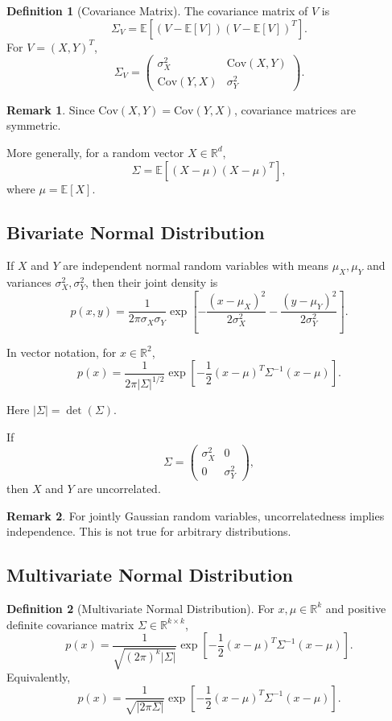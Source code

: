 \documentclass[12pt,oneside]{book}
\numberwithin{equation}{section}
\theoremstyle{definition}
\newtheorem{definition}{Definition}[section]
\newtheorem{remark}{Remark}[section]
\theoremstyle{plain}
\theoremstyle{remark}
\newcommand{\R}{\mathbb{R}}
\newcommand{\E}{\mathbb{E}}
\newcommand{\Cov}{\mathrm{Cov}}
\begin{document}
\begin{definition}[Covariance Matrix]
The covariance matrix of $V$ is
\[
\Sigma_V
=
\E\left[(V-\E[V])(V-\E[V])^T\right].
\]
For $V=(X,Y)^T$,
\[
\Sigma_V
=
\begin{pmatrix}
\sigma_X^2 & \Cov(X,Y)\\
\Cov(Y,X) & \sigma_Y^2
\end{pmatrix}.
\]
\end{definition}

\begin{remark}
Since $\Cov(X,Y)=\Cov(Y,X)$, covariance matrices are symmetric.
\end{remark}

More generally, for a random vector $X \in \R^d$,
\[
\Sigma
=
\E\left[(X-\mu)(X-\mu)^T\right],
\]
where $\mu=\E[X]$.

\subsection{Bivariate Normal Distribution}

If $X$ and $Y$ are independent normal random variables with means $\mu_X,\mu_Y$ and variances $\sigma_X^2,\sigma_Y^2$, then their joint density is
\[
p(x,y)
=
\frac{1}{2\pi\sigma_X\sigma_Y}
\exp\left[
-\frac{(x-\mu_X)^2}{2\sigma_X^2}
-\frac{(y-\mu_Y)^2}{2\sigma_Y^2}
\right].
\]

In vector notation, for $x \in \R^2$,
\[
p(x)
=
\frac{1}{2\pi |\Sigma|^{1/2}}
\exp\left[
-\frac{1}{2}(x-\mu)^T\Sigma^{-1}(x-\mu)
\right].
\]

Here $|\Sigma|=\det(\Sigma)$.

If
\[
\Sigma
=
\begin{pmatrix}
\sigma_X^2 & 0\\
0 & \sigma_Y^2
\end{pmatrix},
\]
then $X$ and $Y$ are uncorrelated.

\begin{remark}
For jointly Gaussian random variables, uncorrelatedness implies independence. This is not true for arbitrary distributions.
\end{remark}

\subsection{Multivariate Normal Distribution}

\begin{definition}[Multivariate Normal Distribution]
For $x,\mu \in \R^k$ and positive definite covariance matrix $\Sigma \in \R^{k\times k}$,
\[
p(x)
=
\frac{1}{\sqrt{(2\pi)^k|\Sigma|}}
\exp\left[
-\frac{1}{2}(x-\mu)^T\Sigma^{-1}(x-\mu)
\right].
\]
Equivalently,
\[
p(x)
=
\frac{1}{\sqrt{|2\pi\Sigma|}}
\exp\left[
-\frac{1}{2}(x-\mu)^T\Sigma^{-1}(x-\mu)
\right].
\]
\end{definition}
\end{document}
